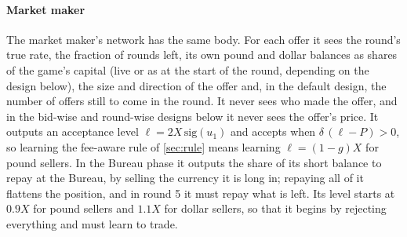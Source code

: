 \documentclass[11pt,a4paper]{article}
\theoremstyle{plain}
\theoremstyle{definition}
\newcommand{\1}{\mathbf{1}}
\begin{document}
\paragraph{Market maker}
The market maker's network has the same body. For each offer it sees the round's true rate, the fraction of rounds left, its own pound and dollar balances as shares of the game's capital (live or as at the start of the round, depending on the design below), the size and direction of the offer and, in the default design, the number of offers still to come in the round. It never sees who made the offer, and in the bid-wise and round-wise designs below it never sees the offer's price. It outputs an acceptance level $\ell=2X\,\mathrm{sig}(u_1)$ and accepts when $\delta\,(\ell-P)>0$, so learning the fee-aware rule of \cref{sec:rule} means learning $\ell=(1-g)X$ for pound sellers. In the Bureau phase it outputs the share of its short balance to repay at the Bureau, by selling the currency it is long in; repaying all of it flattens the position, and in round 5 it must repay what is left. Its level starts at $0.9X$ for pound sellers and $1.1X$ for dollar sellers, so that it begins by rejecting everything and must learn to trade.
\end{document}
